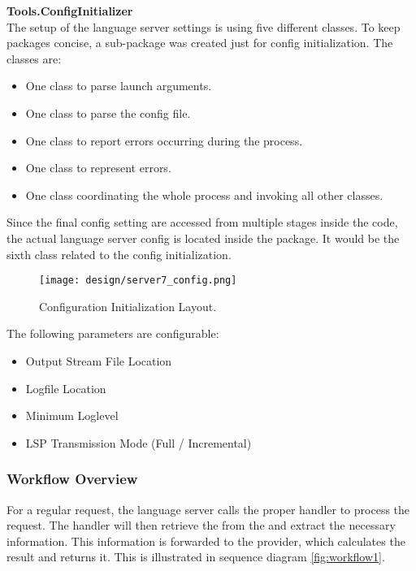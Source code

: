 \textbf{Tools.ConfigInitializer}\\
The setup of the language server settings is using five different classes.
To keep packages concise, a sub-package was created just for config initialization.
The classes are:
\begin{itemize}
    \item One class to parse launch arguments.
    \item One class to parse the config file.
    \item One class to report errors occurring during the process.
    \item One class to represent errors.
    \item One class coordinating the whole process and invoking all other classes.
\end{itemize}
Since the final config setting are accessed from multiple stages inside the code, the actual language server config is located inside the  package.
It would be the sixth class related to the config initialization.

\begin{figure}[H]
    \centering
    \texttt{[image: design/server7\_config.png]}
    \caption{Configuration Initialization Layout.}
    \label{fig:server_config}
\end{figure}

The following parameters are configurable:
\begin{itemize}
    \item Output Stream File Location
    \item Logfile Location
    \item Minimum Loglevel
    \item LSP Transmission Mode (Full / Incremental)
\end{itemize}


\subsubsection{Workflow Overview}
For a regular request, the language server calls the proper handler to process the request.
The handler will then retrieve the  from the  and extract the necessary information.
This information is forwarded to the provider, which calculates the result and returns it.
This is illustrated in sequence diagram \ref{fig:workflow1}.

